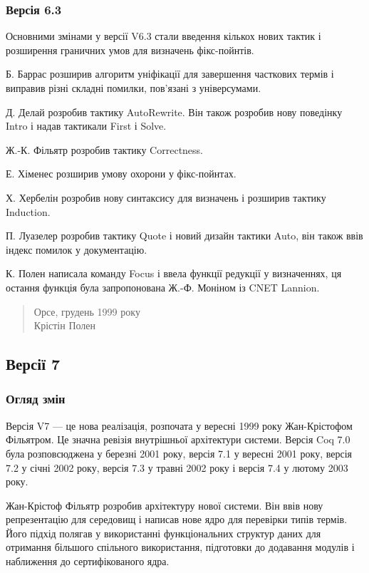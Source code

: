 \documentclass{article}
\begin{document}
\subsubsection{Версія 6.3}

Основними змінами у версії V6.3 стали введення кількох нових тактик і розширення граничних умов для визначень фікс-пойнтів.

Б. Баррас розширив алгоритм уніфікації для завершення часткових термів і виправив різні складні помилки, пов’язані з універсумами.

Д. Делай розробив тактику AutoRewrite. Він також розробив нову поведінку Intro і надав тактикали First і Solve.

Ж.-К. Фільятр розробив тактику Correctness.

Е. Хіменес розширив умову охорони у фікс-пойнтах.

Х. Хербелін розробив нову синтаксису для визначень і розширив тактику Induction.

П. Луазелер розробив тактику Quote і новий дизайн тактики Auto, він також ввів індекс помилок у документацію.

К. Полен написала команду Focus і ввела функції редукції у визначеннях, ця остання функція була запропонована Ж.-Ф. Моніном із CNET Lannion.

\begin{quote}
Орсе, грудень 1999 року \\
Крістін Полен
\end{quote}

\subsection{Версії 7}

\subsubsection{Огляд змін}

Версія V7 — це нова реалізація, розпочата у вересні 1999 року Жан-Крістофом Фільятром. Це значна ревізія внутрішньої архітектури системи. Версія Coq 7.0 була розповсюджена у березні 2001 року, версія 7.1 у вересні 2001 року, версія 7.2 у січні 2002 року, версія 7.3 у травні 2002 року і версія 7.4 у лютому 2003 року.

Жан-Крістоф Фільятр розробив архітектуру нової системи. Він ввів нову репрезентацію для середовищ і написав нове ядро для перевірки типів термів. Його підхід полягав у використанні функціональних структур даних для отримання більшого спільного використання, підготовки до додавання модулів і наближення до сертифікованого ядра.
\end{document}
